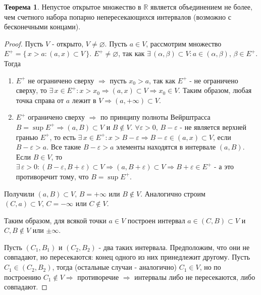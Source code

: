 \documentclass[12pt]{article}
\theoremstyle{definition}
\newtheorem{theorem}{Теорема}
\begin{document}
\begin{theorem}
	Непустое открытое множество в $\mathbb{R}$ является объединением не более, чем счетного набора попарно непересекающихся интервалов (возможно с бесконечными концами). 
\end{theorem}

\begin{proof}
	Пусть $V$ - открыто, $V \neq \varnothing$. Пусть $a \in V$, рассмотрим множество $E^{+} = \{\, x > a \colon (a,x) \subset V \,\}$. $E^{+}  \neq \varnothing$, так как $\exists \, (\alpha, \beta) \subset V \colon a \in (\alpha, \beta), \, \beta \in E^{+}$. Тогда
	\begin{enumerate}[label={\arabic*)}]
		\item $E^+$ не ограничено сверху $\Rightarrow$ пусть $x_0 > a$, так как $E^+$ - не ограничено сверху, то $\exists \, x \in E^+ \colon x > x_0 \Rightarrow (a,x) \subset V \Rightarrow x_0 \in V$. Таким образом, любая точка справа от $a$ лежит в $V \Rightarrow (a, +\infty) \subset V$.
		
		\item $E^+$ ограничено сверху $\Rightarrow$ по принципу полноты Вейрштрасса $B = \sup{E^+} \Rightarrow (a, B) \subset V$ и $B \notin V$. $\forall \varepsilon > 0, \, B - \varepsilon$ - не является верхней гранью $E^+$, то есть $\exists \, x \in E^+ \colon x > B - \varepsilon \Rightarrow B - \varepsilon \in (a,x) \subset V$, если $B - \varepsilon > a$. Все такие $B - \varepsilon > a$ элементы находятся в интервале $(a, B)$. Если $B \in V$, то $\exists \, \varepsilon > 0 \colon (B - \varepsilon, B + \varepsilon) \subset V \Rightarrow (a, B + \varepsilon) \subset V \Rightarrow B + \varepsilon \in E^+$ - а это противоречит тому, что $B = \sup{E^+}$.
	\end{enumerate} 

	Получили $(a, B) \subset V, \, B = +\infty$ или $B \notin V$. Аналогично строим $(C,a) \subset V, \, C = -\infty$ или $C \notin V$. 
	
	Таким образом, для всякой точки $a \in V$ построен интервал $a \in (C,B) \subset V$ и $C, B \notin V$ или $\pm \infty$.
	
	Пусть $(C_1, B_1)$ и $(C_2, B_2)$ - два таких интервала. Предположим, что они не совпадают, но пересекаются: конец одного из них принедлежит другому. Пусть $C_1 \in (C_2, B_2)$, тогда (остальные случаи - аналогично) $C_1 \in V$, но по построению $C_1 \notin V \Rightarrow$ противоречие $\Rightarrow$ интервалы либо не пересекаются, либо совпадают.
	

\end{proof}
\end{document}
